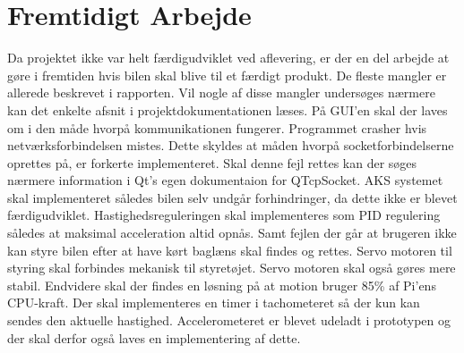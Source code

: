 \chapter{Fremtidigt Arbejde} \label{ch:Fremtidigt_arbejde}

Da projektet ikke var helt færdigudviklet ved aflevering, er der en del arbejde at gøre i fremtiden hvis bilen skal blive til et færdigt produkt. 
De fleste mangler er allerede beskrevet i rapporten. Vil nogle af disse mangler undersøges nærmere kan det enkelte afsnit i projektdokumentationen læses. 
På GUI'en skal der laves om i den måde hvorpå kommunikationen fungerer. 
Programmet crasher hvis netværksforbindelsen mistes. Dette skyldes at måden hvorpå socketforbindelserne oprettes på, er forkerte implementeret. 
Skal denne fejl rettes kan der søges nærmere information i Qt's egen dokumentaion for QTcpSocket\cite{lib:qtcpsocket}.
AKS systemet skal implementeret således bilen selv undgår forhindringer, da dette ikke er blevet færdigudviklet.
Hastighedsreguleringen skal implementeres som PID regulering således at maksimal acceleration altid opnås. 
Samt fejlen der går at brugeren ikke kan styre bilen efter at have kørt baglæns skal findes og rettes. 
Servo motoren til styring skal forbindes mekanisk til styretøjet. Servo motoren skal også gøres mere stabil.
Endvidere skal der findes en løsning på at motion bruger 85\% af Pi'ens CPU-kraft. 
Der skal implementeres en timer i tachometeret så der kun kan sendes den aktuelle hastighed. 
Accelerometeret er blevet udeladt i prototypen og der skal derfor også laves en implementering af dette.